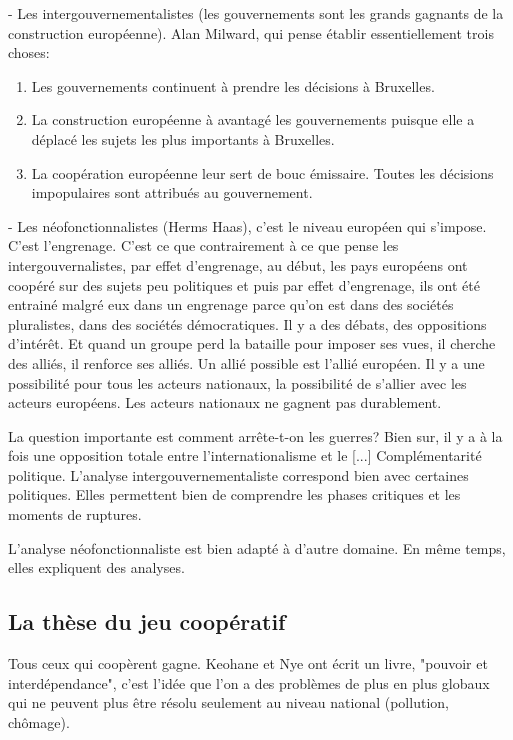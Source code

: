 - Les intergouvernementalistes (les gouvernements sont les grands gagnants de la construction européenne). Alan Milward, qui pense établir essentiellement trois choses:
\begin{enumerate}
\item Les gouvernements continuent à prendre les décisions à Bruxelles.
\item La construction européenne à avantagé les gouvernements puisque elle a déplacé les sujets les plus importants à Bruxelles.
\item La coopération européenne leur sert de bouc émissaire. Toutes les décisions impopulaires sont attribués au gouvernement.
\end{enumerate}

- Les néofonctionnalistes (Herms Haas), c'est le niveau européen qui s'impose. C'est l'engrenage. C'est ce que contrairement à ce que pense les intergouvernalistes, par effet d'engrenage, au début, les pays européens ont coopéré sur des sujets peu politiques et puis par effet d'engrenage, ils ont été entrainé malgré eux dans un engrenage parce qu'on est dans des sociétés pluralistes, dans des sociétés démocratiques. Il y a des débats, des oppositions d'intérêt. Et quand un groupe perd la bataille pour imposer ses vues, il cherche des alliés, il renforce ses alliés. Un allié possible est l'allié européen. Il y a une possibilité pour tous les acteurs nationaux, la possibilité de s'allier avec les acteurs européens. Les acteurs nationaux ne gagnent pas durablement.

La question importante est comment arrête-t-on les guerres? 
Bien sur, il y a à la fois une opposition totale entre l'internationalisme et le [...]
Complémentarité politique. L'analyse intergouvernementaliste correspond bien avec certaines politiques. Elles permettent bien de comprendre les phases critiques et les moments de ruptures.

L'analyse néofonctionnaliste est bien adapté à d'autre domaine. En même temps, elles expliquent des analyses.

\subsection{La thèse du jeu coopératif}

Tous ceux qui coopèrent gagne. Keohane et Nye ont écrit un livre, "pouvoir et interdépendance", c'est l'idée que l'on a des problèmes de plus en plus globaux qui ne peuvent plus être résolu seulement au niveau national (pollution, chômage).

